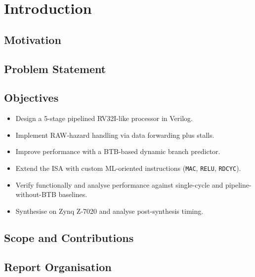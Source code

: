 \chapter{Introduction}
\label{ch:intro}

\section{Motivation}

\section{Problem Statement}

\section{Objectives}
\begin{itemize}
  \item Design a 5-stage pipelined RV32I-like processor in Verilog.
  \item Implement RAW-hazard handling via data forwarding plus stalls.
  \item Improve performance with a BTB-based dynamic branch predictor.
  \item Extend the ISA with custom ML-oriented instructions
        (\texttt{MAC}, \texttt{RELU}, \texttt{RDCYC}).
  \item Verify functionally and analyse performance against single-cycle
        and pipeline-without-BTB baselines.
  \item Synthesise on Zynq Z-7020 and analyse post-synthesis timing.
\end{itemize}

\section{Scope and Contributions}

\section{Report Organisation}

